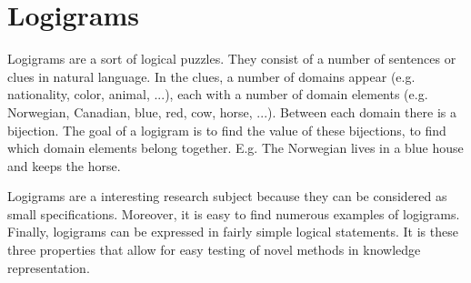 \section{Logigrams}
Logigrams are a sort of logical puzzles. They consist of a number of sentences or clues in natural language. In the clues, a number of domains appear (e.g. nationality, color, animal, ...), each with a number of domain elements (e.g. Norwegian, Canadian, blue, red, cow, horse, ...). Between each domain there is a bijection. The goal of a logigram is to find the value of these bijections, to find which domain elements belong together. E.g. The Norwegian lives in a blue house and keeps the horse.

Logigrams are a interesting research subject because they can be considered as small specifications. Moreover, it is easy to find numerous examples of logigrams. Finally, logigrams can be expressed in fairly simple logical statements. It is these three properties that allow for easy testing of novel methods in knowledge representation.
